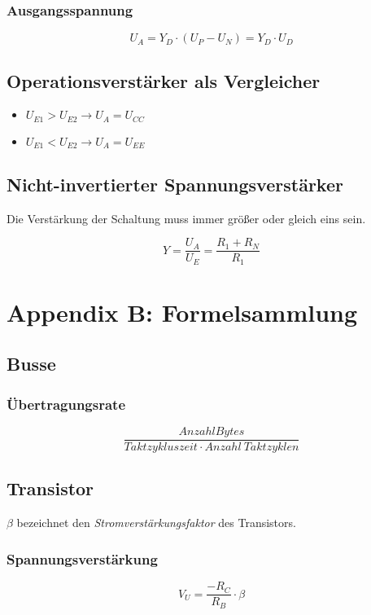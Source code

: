 \subsubsection{Ausgangsspannung}
\[U_A = Y_D \cdot (U_P - U_N) = Y_D \cdot U_D\]


\subsection{Operationsverstärker als Vergleicher}
\begin{itemize}
	\item $U_{E1} > U_{E2} \rightarrow U_A = U_{CC}$
	\item $U_{E1} < U_{E2} \rightarrow U_A = U_{EE}$
\end{itemize}


\subsection{Nicht-invertierter Spannungsverstärker}
Die Verstärkung der Schaltung muss immer größer oder gleich eins sein.

\[Y = \frac{U_A}{U_E} = \frac{R_1 + R_N}{R_1}\]



\section{Appendix B: Formelsammlung}

\subsection{Busse}

\subsubsection{Übertragungsrate}
\[\frac{AnzahlBytes}{Taktzykluszeit \cdot Anzahl~Taktzyklen}\]


\subsection{Transistor}
$\beta$ bezeichnet den \textit{Stromverstärkungsfaktor} des Transistors.

\subsubsection{Spannungsverstärkung}
\[V_U = \frac{-R_C}{R_B} \cdot \beta\]

